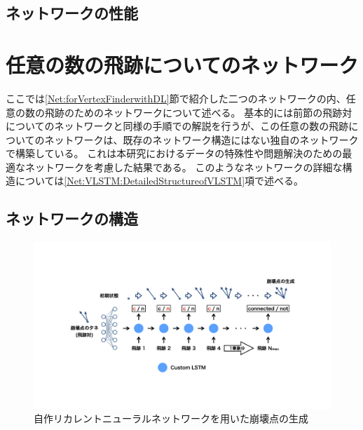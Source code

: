 \subsection{ネットワークの性能} \label{Net:PM:PerformanceofPM}

\section{任意の数の飛跡についてのネットワーク} \label{Net:VertexLSTM}

ここでは\ref{Net:forVertexFinderwithDL}節で紹介した二つのネットワークの内、任意の数の飛跡のためのネットワークについて述べる。
基本的には前節の飛跡対についてのネットワークと同様の手順での解説を行うが、この任意の数の飛跡についてのネットワークは、既存のネットワーク構造にはない独自のネットワークで構築している。
これは本研究におけるデータの特殊性や問題解決のための最適なネットワークを考慮した結果である。
このようなネットワークの詳細な構造については\ref{Net:VLSTM:DetailedStructureofVLSTM}項で述べる。


\subsection{ネットワークの構造} \label{Net:VLSTM:StructureofVLSTM}

\begin{figure}[h]
 \centering
 \includegraphics[width=1.0\textwidth]{Figure/3Networks/3-4-1-1SimpleVLSTM.png}
 \caption{自作リカレントニューラルネットワークを用いた崩壊点の生成}
 \label{3-4-1-1SimpleVLSTM.png}
\end{figure}

